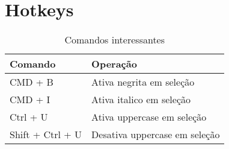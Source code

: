 


\section{Hotkeys}

\begin{table}[h]
    \centering
    \begin{tabular}{| l | l |}
        \hline
        \textbf{Comando} & \textbf{Operação} \\
        \hline
        CMD + B & Ativa negrita em seleção \\
        CMD + I & Ativa italico em seleção \\
        Ctrl + U & Ativa uppercase em seleção \\
        Shift + Ctrl + U & Desativa uppercase em seleção \\
        \hline
    \end{tabular}
    \caption{Comandos interessantes}
    \label{tab:my_label}
\end{table}